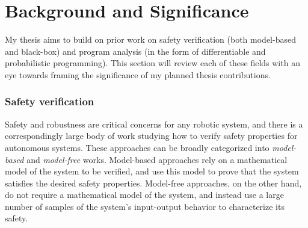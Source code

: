 \chapter{Background and Significance}\label{section:lit_review}


My thesis aims to build on prior work on safety verification (both model-based and black-box) and program analysis (in the form of differentiable and probabilistic programming). This section will review each of these fields with an eye towards framing the significance of my planned thesis contributions.

\subsection{Safety verification}



Safety and robustness are critical concerns for any robotic system, and there is a correspondingly large body of work studying how to verify safety properties for autonomous systems. These approaches can be broadly categorized into \textit{model-based} and \textit{model-free} works. Model-based approaches rely on a mathematical model of the system to be verified, and use this model to prove that the system satisfies the desired safety properties. Model-free approaches, on the other hand, do not require a mathematical model of the system, and instead use a large number of samples of the system's input-output behavior to characterize its safety.

